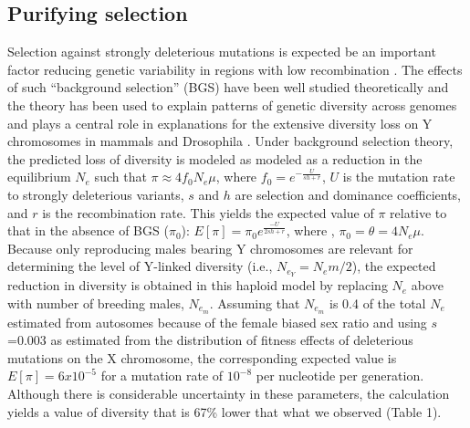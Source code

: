 \documentclass[9pt,twocolumn,twoside]{gsajnl}
\begin{document}
\subsection*{Purifying selection}
Selection against strongly deleterious mutations is expected be an important factor reducing genetic variability in regions with low recombination \citep{charlesworth1993effect, charlesworth1996background}. The effects of such “background selection” (BGS) have been well studied theoretically \citep{charlesworth1997effects, nordborg1996effect, kim2000joint} and the theory has been used to explain patterns of genetic diversity across genomes \citep{comeron2014background} and plays a central role in explanations for the extensive diversity loss on Y chromosomes in mammals \citep{Wilsonsayres2014} and Drosophila \citep{mcallister1999, charlesworth1996CB}. Under background selection theory, the predicted loss of diversity is modeled as modeled as a reduction in the equilibrium $N_{e}$ such that $\pi \approx 4f_{0}N_{e}\mu$, where $f_{0}=e^{-\frac{U}{sh+r}}$, $U$ is the mutation rate to strongly deleterious variants, $s$ and $h$ are selection and dominance coefficients, and $r$ is the recombination rate. This yields the expected value of $\pi$ relative to that in the absence of BGS ($\pi_{0}$): $E[\pi]= \pi_{0}e^{\frac{-U}{2sh+r}}$, where , $\pi_{0}=\theta=4N_{e}\mu$. Because only reproducing males bearing Y chromosomes are relevant for determining the level of Y-linked diversity (i.e., $N_{e}_{Y} = N_{e}{m}/2$), the expected reduction in diversity is obtained in this haploid model by replacing $N_{e}$ above with number of breeding males, $N_{e}_{m}$. Assuming that $N_{e}_{m}$ is 0.4 of the total $N_{e}$ estimated from autosomes because of the female biased sex ratio \citep{pickup2013influence} and using $s$=0.003 as estimated from the distribution of fitness effects of deleterious mutations on the X chromosome, the corresponding expected value is $E[\pi]= 6x10^{-5}$ for a mutation rate of $10^{-8}$ per nucleotide per generation. Although there is considerable uncertainty in these parameters, the calculation yields a value of diversity that is 67\% lower that what we observed (Table 1).
\end{document}
